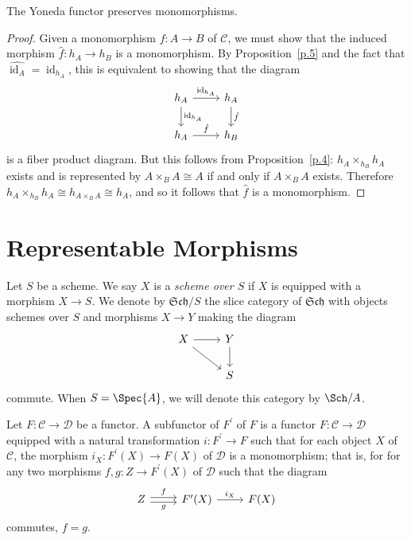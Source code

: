 \documentclass[10pt]{amsart}
\begin{document}
\begin{cor}
  The Yoneda functor preserves monomorphisms.

  \begin{proof}
    Given a monomorphism $f \colon A \rightarrow B$ of $\mathscr{C}$, we must show that the induced morphism $\hat{f} \colon h_A \rightarrow h_B$ is a monomorphism.
    By Proposition~\ref{p.5} and the fact that $\hat{\operatorname{id}_A} = \operatorname{id}_{h_A}$, this is equivalent to showing that the diagram
    $$\begin{tikzcd}
      h_A \arrow{d}{\operatorname{id}_{h_A}}\arrow{r}{\operatorname{id}_{h_A}} & h_A\arrow{d}{\hat{f}}\\
    h_A \arrow{r}{\hat{f}} & h_B
  \end{tikzcd}$$
    is a fiber product diagram.
    But this follows from Proposition~\ref{p.4}: $h_A \times_{h_B} h_A$ exists and is represented by $A \times_B A \cong A$ if and only if $A \times_B A$ exists.
    Therefore $h_A \times_{h_B} h_A \cong h_{A \times_B A} \cong h_A$, and so it follows that $\hat{f}$ is a monomorphism.
  \end{proof}
\end{cor}

\section{Representable Morphisms}
\begin{defn}
  Let $S$ be a scheme.
  We say $X$ is a {\em scheme over $S$} if $X$ is equipped with a morphism $X \rightarrow S$.
  We denote by $\mathfrak{Sch}/S$ the slice category of $\mathfrak{Sch}$ with objects schemes over $S$ and morphisms $X \rightarrow Y$ making the diagram
  $$\begin{tikzcd}
    X\arrow{r}\arrow{rd} & Y\arrow{d}\\
    & S
  \end{tikzcd}$$
  commute.
  When $S = \Spec{A}$, we will denote this category by $\Sch/A$.
\end{defn}

\begin{defn}
  Let $F \colon \mathscr{C} \rightarrow \mathscr{D}$ be a functor.
  A subfunctor of $F^\prime$ of $F$ is a functor $F \colon \mathscr{C} \rightarrow \mathscr{D}$ equipped with a natural transformation $i : F^\prime \rightarrow F$ such that for each object $X$ of $\mathscr{C}$, the morphism $i_X : F^\prime(X) \rightarrow F(X)$ of $\mathscr{D}$ is a monomorphism; that is, for for any two morphisms $f,g \colon Z \rightarrow F^\prime(X)$ of $\mathscr{D}$ such that the diagram
  $$\begin{tikzcd}
    Z \arrow[yshift=-.5ex,swap]{r}{g}\arrow[yshift=.5ex]{r}{f} & F^\prime(X) \arrow{r}{i_X} & F(X)
  \end{tikzcd}$$
  commutes, $f = g$.
\end{defn}
\end{document}
